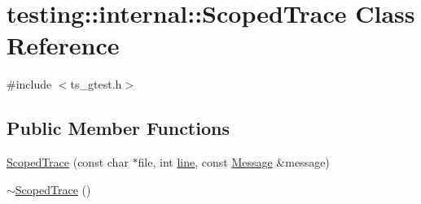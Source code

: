 \hypertarget{classtesting_1_1internal_1_1ScopedTrace}{\section{testing\-:\-:internal\-:\-:Scoped\-Trace Class Reference}
\label{classtesting_1_1internal_1_1ScopedTrace}
}


{\ttfamily \#include $<$ts\-\_\-gtest.\-h$>$}

\subsection*{Public Member Functions}
\begin{DoxyCompactItemize}
\item 
\hyperlink{classtesting_1_1internal_1_1ScopedTrace_ab965d7010bbbc82c1bef6ebf8748bede}{Scoped\-Trace} (const char $\ast$file, int \hyperlink{legacy_8hpp_a5a869825573cfaf8861a6ec0fe0f262f}{line}, const \hyperlink{classtesting_1_1Message}{Message} \&message)
\item 
\hyperlink{classtesting_1_1internal_1_1ScopedTrace_a658c7c098ff48337058bfa2ccab65881}{$\sim$\-Scoped\-Trace} ()
\end{DoxyCompactItemize}


